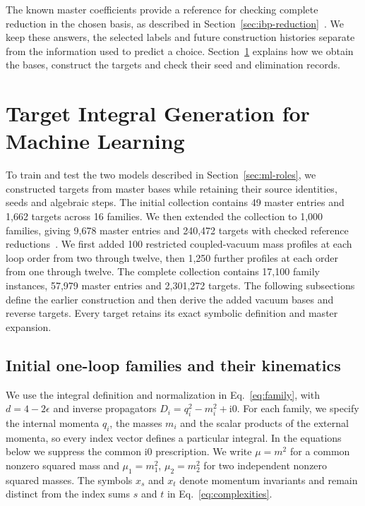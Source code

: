 \documentclass[11pt,a4paper]{article}
\begin{document}
The known master coefficients provide a reference for checking
complete reduction in the chosen basis, as described in
Section~\ref{sec:ibp-reduction}~\cite{Kira3}. We keep these answers,
the selected labels and future construction histories separate from
the information used to predict a choice.
Section~\ref{sec:integrals-generation} explains how we obtain the
bases, construct the targets and check their seed and elimination
records.
\section{Target Integral Generation for Machine Learning}
\label{sec:integrals-generation}
To train and test the two models described in Section~\ref{sec:ml-roles},
we constructed targets from master bases while retaining their source
identities, seeds and algebraic steps. The initial collection contains
49 master entries and 1,662 targets across 16 families. We then
extended the collection to 1,000 families, giving 9,678 master
entries and 240,472 targets with checked reference
reductions~\cite{MasterIntegralData,TargetIntegralData,ExpandedIntegralData}.
We first added 100 restricted coupled-vacuum mass profiles at each
loop order from two through twelve, then 1,250 further profiles at each
order from one through twelve. The complete collection contains
17,100 family instances, 57,979 master entries and 2,301,272 targets.
The following subsections define the earlier construction and then
derive the added vacuum bases and reverse targets.
Every target retains its exact symbolic definition and master
expansion.

\subsection{Initial one-loop families and their kinematics}
We use the integral definition and normalization in
Eq.~\eqref{eq:family}, with $d=4-2\epsilon$ and inverse propagators
$D_i=q_i^2-m_i^2+\mathrm{i}0$. For each family, we specify the internal
momenta $q_i$, the masses $m_i$ and the scalar products of the external
momenta, so every index vector defines a particular integral. In the
equations below we suppress the common $\mathrm{i}0$ prescription.
We write $\mu=m^2$ for a common nonzero squared mass and
$\mu_1=m_1^2$, $\mu_2=m_2^2$ for two independent nonzero squared masses.
The symbols $x_s$ and $x_t$ denote momentum invariants and remain
distinct from the index sums $s$ and $t$ in
Eq.~\eqref{eq:complexities}.
\end{document}
